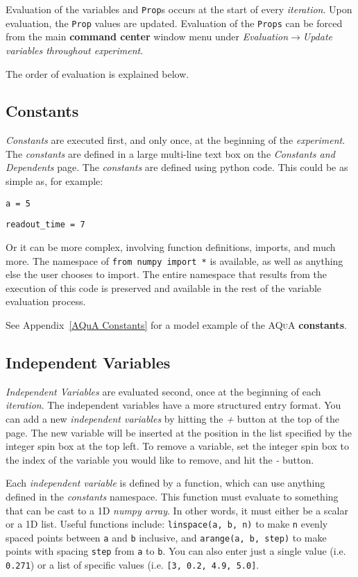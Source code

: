 \documentclass[pdftex,11pt,letterpaper]{article}
\begin{document}
Evaluation of the variables and \texttt{Prop}s occurs at the start of every \textit{iteration}.  Upon evaluation, the \texttt{Prop} values are updated.  Evaluation of the \texttt{Props} can be forced from the main \textbf{command center} window menu under \textit{Evaluation}$\rightarrow$\textit{Update variables throughout experiment}.

The order of evaluation is explained below.

\subsection{Constants}

\textit{Constants} are executed first, and only once, at the beginning of the \textit{experiment}.  The \textit{constants} are defined in a large multi-line text box on the \textit{Constants and Dependents} page.  The \textit{constants} are defined using python code.  This could be as simple as, for example:

\texttt{a = 5}

\texttt{readout\_time = 7}

Or it can be more complex, involving function definitions, imports, and much more.  The namespace of \texttt{from numpy import *} is available, as well as anything else the user chooses to import.  The entire namespace that results from the execution of this code is preserved and available in the rest of the variable evaluation process.

See Appendix~\ref{AQuA Constants} for a model example of the \textsc{AQuA} \textbf{constants}.


\subsection{Independent Variables}

\textit{Independent Variables} are evaluated second, once at the beginning of each \textit{iteration}.  The independent variables have a more structured entry format.  You can add a new \textit{independent variables} by hitting the \textit{+} button at the top of the page.  The new variable will be inserted at the position in the list specified by the integer spin box at the top left.  To remove a variable, set the integer spin box to the index of the variable you would like to remove, and hit the \textit{-} button.

Each \textit{independent variable} is defined by a function, which can use anything defined in the \textit{constants} namespace.  This function must evaluate to something that can be cast to a 1D \textit{numpy array}.  In other words, it must either be a scalar or a 1D list.  Useful functions include: \texttt{linspace(a, b, n)} to make \texttt{n} evenly spaced points between \texttt{a} and \texttt{b} inclusive, and \texttt{arange(a, b, step)} to make points with spacing \texttt{step} from \texttt{a} to \texttt{b}.  You can also enter just a single value (i.e. \texttt{0.271}) or a list of specific values (i.e. \texttt{[3, 0.2, 4.9, 5.0]}.
\end{document}

